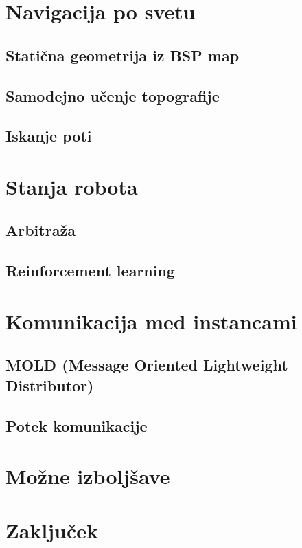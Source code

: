 \documentclass[a4paper,10pt]{article}
\begin{document}
\section{Navigacija po svetu}

\subsection{Statična geometrija iz BSP map}

\subsection{Samodejno učenje topografije}

\subsection{Iskanje poti}

\section{Stanja robota}

\subsection{Arbitraža}

\subsection{Reinforcement learning}

\section{Komunikacija med instancami}

\subsection{MOLD (Message Oriented Lightweight Distributor)}

\subsection{Potek komunikacije}

\section{Možne izboljšave}

\section{Zaključek}
\end{document}
